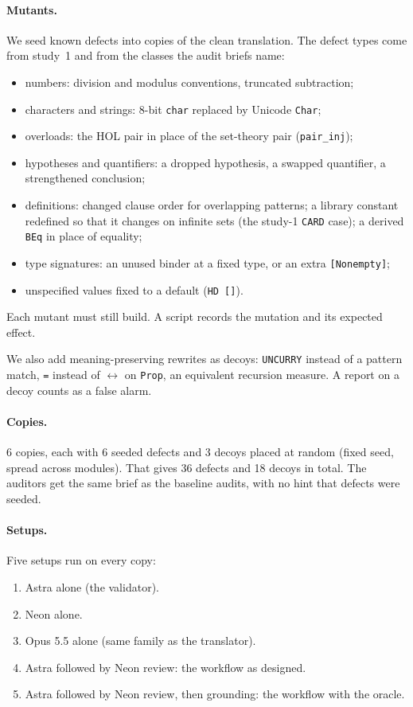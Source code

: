\documentclass[11pt,a4paper]{article}
\newcommand{\code}[1]{\texttt{#1}}
\begin{document}
\paragraph{Mutants.} We seed known defects into copies of the clean translation. The defect types come from study~1 and from the classes the audit briefs name:
\begin{itemize}
\item numbers: division and modulus conventions, truncated subtraction;
\item characters and strings: 8-bit \code{char} replaced by Unicode \code{Char};
\item overloads: the HOL pair in place of the set-theory pair (\code{pair\_inj});
\item hypotheses and quantifiers: a dropped hypothesis, a swapped quantifier, a strengthened conclusion;
\item definitions: changed clause order for overlapping patterns; a library constant redefined so that it changes on infinite sets (the study-1 \code{CARD} case); a derived \code{BEq} in place of equality;
\item type signatures: an unused binder at a fixed type, or an extra \code{[Nonempty]};
\item unspecified values fixed to a default (\code{HD []}).
\end{itemize}
Each mutant must still build. A script records the mutation and its expected effect.

We also add meaning-preserving rewrites as decoys: \code{UNCURRY} instead of a pattern match, \code{=} instead of \code{$\leftrightarrow$} on \code{Prop}, an equivalent recursion measure. A report on a decoy counts as a false alarm.

\paragraph{Copies.} 6 copies, each with 6 seeded defects and 3 decoys placed at random (fixed seed, spread across modules). That gives 36 defects and 18 decoys in total. The auditors get the same brief as the baseline audits, with no hint that defects were seeded.

\paragraph{Setups.} Five setups run on every copy:
\begin{enumerate}[label=S\arabic*.]
\item Astra alone (the validator).
\item Neon alone.
\item Opus 5.5 alone (same family as the translator).
\item Astra followed by Neon review: the workflow as designed.
\item Astra followed by Neon review, then grounding: the workflow with the oracle.
\end{enumerate}
\end{document}

